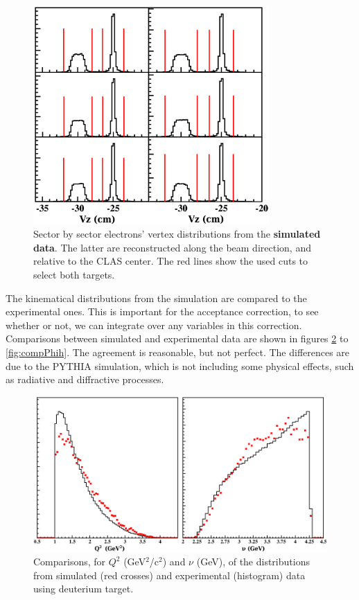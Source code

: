 \begin{figure}[tpb]
\centering
\includegraphics[width=9cm] {chap5-fig/Vertex_el_sim.png}
\caption {Sector by sector electrons' vertex distributions from the {\bf simulated data}. The latter are reconstructed along the beam direction, and relative to the CLAS center. The red lines show the used cuts to select both targets.}
\label{simvertex}
\end{figure}

The kinematical distributions from the simulation are compared to the 
experimental ones. This is important for the acceptance correction, to see 
whether or not, we can integrate over any variables in this correction.
Comparisons between simulated and experimental data are shown in figures 
\ref{fig:compNuQ2} to \ref{fig:compPhih}. The agreement is reasonable, but not 
perfect. The differences are due to the PYTHIA simulation, which is not including some 
physical effects, such as radiative and diffractive processes.

\begin{figure}[tbp]
\centering
\includegraphics[width=12cm] {chap5-fig/El_compar.png}
\caption {Comparisons, for $Q^2$ (GeV$^2$/c$^2$) and $\nu$ (GeV), of the distributions
from simulated (red crosses) and experimental (histogram) data using deuterium target.}
\label{fig:compNuQ2}
\end{figure}

